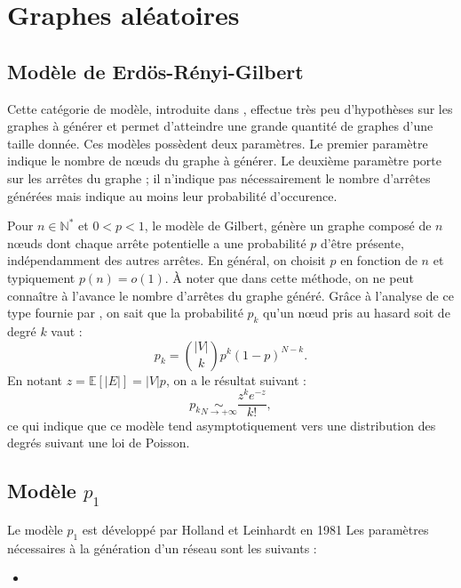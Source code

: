 \documentclass[a4paper]{article}
\begin{document}
\section{Graphes aléatoires}
\label{sec:graphes_aleatoires}

    \subsection{Modèle de Erdös-Rényi-Gilbert}
    \label{sub:modele_erdos}
    Cette catégorie de modèle, introduite dans \cite{erdHos1960evolution},
    effectue très peu d'hypothèses sur les graphes à générer et permet
    d'atteindre une grande quantité de graphes d'une taille donnée. Ces modèles
    possèdent deux paramètres. Le premier paramètre indique le nombre de
    n\oe{}uds du graphe à générer. Le deuxième paramètre porte sur les arrêtes
    du graphe ; il n'indique pas nécessairement le nombre d'arrêtes générées
    mais indique au moins leur probabilité d'occurence.

    Pour $n \in \mathbb{N}^*$ et $0 < p < 1$, le modèle de Gilbert,
    génère un graphe composé de $n$ n\oe{}uds dont chaque arrête
    potentielle a une probabilité $p$ d'être présente, indépendamment
    des autres arrêtes.
    En général, on choisit $p$ en fonction de $n$ et typiquement
    $p(n) = o(1)$. \`A noter que dans cette méthode, on ne peut
    connaître à l'avance le nombre d'arrêtes du graphe généré.
    Gr\^ace à l'analyse de ce type fournie par \cite{newman2001random},
    on sait que la probabilité $p_k$ qu'un n\oe{}ud pris au hasard
    soit de degré $k$ vaut :
    \[
        p_k = \binom{|V|}{k} p^k (1 - p)^{N - k}.
    \]
    En notant $z = \mathbb{E}\left[|E|\right] = |V|p$, on a le résultat
    suivant :
    \[
        p_k \underset{N \rightarrow +\infty}{\sim}
        \frac{z^k e^{-z}}{k!},
    \]
    ce qui indique que ce modèle tend asymptotiquement vers une
    distribution des degrés suivant une loi de Poisson.

    \subsection{Modèle $p_1$}
    Le modèle $p_1$ \cite{holland1981exponential} est développé par Holland et
    Leinhardt en 1981
    Les paramètres nécessaires à la génération d'un réseau
    sont les suivants :
    \begin{itemize}
        \item 
    \end{itemize}
\end{document}

